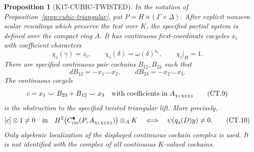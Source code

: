 \documentclass[11pt,a4paper]{article}
\newtheorem{proposition}[theorem]{Proposition}
\theoremstyle{definition}
\begin{document}
\begin{proposition}[K17-CUBIC-TWISTED]
\label{prop:cubic-twisted}
In the notation of Proposition~\ref{prop:cubic-triangular}, put
\(P=H\rtimes(\Gamma\times\Delta)\). After explicit nonzero scalar
rescalings which preserve the test over \(K\), the specified partial
system is defined over the compact ring \(A\). It has continuous
first-coordinate cocycles \(x_i\) with coefficient characters
\[
 \chi_i(\gamma)=z_i,\qquad
 \chi_i(\delta)=\omega(\delta)^{a_i},\qquad
 \chi_i|_H=1.
 \tag{CT.8}
\]
There are specified continuous pair cochains \(B_{12},B_{23}\) such that
\[
 dB_{12}=-x_1\smile x_2,\qquad dB_{23}=-x_2\smile x_3.
\]
The continuous cocycle
\[
 c=x_1\smile B_{23}+B_{12}\smile x_3
 \quad\hbox{with coefficients in }A_{\chi_1\chi_2\chi_3}
 \tag{CT.9}
\]
is the obstruction to the specified twisted triangular lift. More
precisely,
\[
 [c]\otimes1\ne0
 \quad\hbox{in}\quad
 H^2\bigl(C^\bullet_{\rm cts}(P,A_{\chi_1\chi_2\chi_3})\bigr)
       \otimes_A K
 \quad\Longleftrightarrow\quad
 \psi(q_a(D)y)\ne0.
 \tag{CT.10}
\]
Only algebraic localization of the displayed continuous cochain complex
is used. It is not identified with the complex of all continuous
\(K\)-valued cochains.
\end{proposition}
\end{document}
